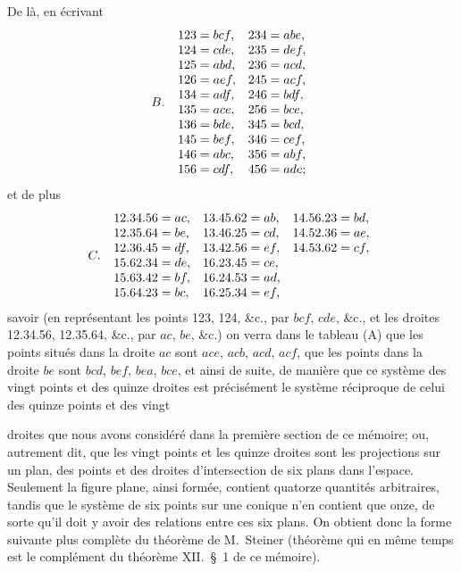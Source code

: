 \documentclass[11pt]{article}
\begin{document}
\medskip
\noindent De l\`a, en \'ecrivant
\[
B.\;\;\begin{array}{l@{\quad}l}
123 = bcf, & 234 = abe,\\
124 = cde, & 235 = def,\\
125 = abd, & 236 = acd,\\
126 = aef, & 245 = acf,\\
134 = adf, & 246 = bdf,\\
135 = ace, & 256 = bce,\\
136 = bde, & 345 = bcd,\\
145 = bef, & 346 = cef,\\
146 = abc, & 356 = abf,\\
156 = cdf, & 456 = ade;
\end{array}
\]
et de plus
\[
C.\;\;\begin{array}{l@{\quad}l@{\quad}l}
12.34.56 = ac, & 13.45.62 = ab, & 14.56.23 = bd,\\
12.35.64 = be, & 13.46.25 = cd, & 14.52.36 = ae,\\
12.36.45 = df, & 13.42.56 = ef, & 14.53.62 = cf,\\
15.62.34 = de, & 16.23.45 = ce, & \\
15.63.42 = bf, & 16.24.53 = ad, & \\
15.64.23 = bc, & 16.25.34 = ef, & \\
\end{array}
\]
savoir (en repr\'esentant les points 123, 124, \&c., par $bcf$, $cde$, \&c., et les droites 12.34.56,
12.35.64, \&c., par $ac$, $be$, \&c.) on verra dans le tableau (A) que les points situ\'es
dans la droite $ac$ sont $ace$, $acb$, $acd$, $acf$, que les points dans la droite $be$ sont $bcd$, $bef$,
$bea$, $bce$, et ainsi de suite, de mani\`ere que ce syst\`eme des vingt points et des quinze
droites est pr\'ecis\'ement le syst\`eme r\'eciproque de celui des quinze points et des vingt

\bigskip

\noindent droites que nous avons consid\'er\'e dans la premi\`ere section de ce m\'emoire; ou, autre\-ment
dit, que les vingt points et les quinze droites sont les projections sur un plan,
des points et des droites d'intersection de six plans dans l'espace. Seulement la figure
plane, ainsi form\'ee, contient quatorze quantit\'es arbitraires, tandis que le syst\`eme de
six points sur une conique n'en contient que onze, de sorte qu'il doit y avoir des
relations entre ces six plans. On obtient donc la forme suivante plus compl\`ete du
th\'eor\`eme de M.~Steiner (th\'eor\`eme qui en m\^eme temps est le compl\'ement du th\'eor\`eme
XII.\ \S\ 1 de ce m\'emoire).
\end{document}
